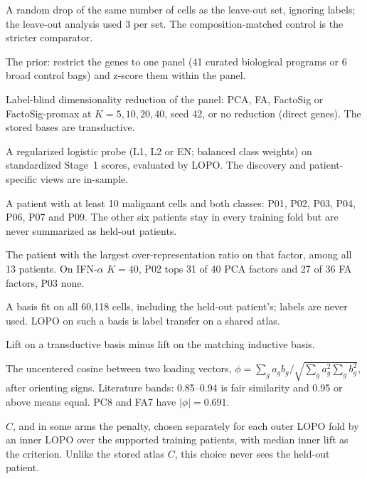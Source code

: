 \begin{description}[leftmargin=0pt,itemsep=3pt,font=\normalfont\bfseries]
\item[Size-matched control.] A random drop of the same number of cells as the leave-out set, ignoring labels; the leave-out analysis used 3 per set. The composition-matched control is the stricter comparator.

\item[Stage~0.] The prior: restrict the genes to one panel (41 curated biological programs or 6 broad control bags) and z-score them within the panel.

\item[Stage~1.] Label-blind dimensionality reduction of the panel: PCA, FA, FactoSig or FactoSig-promax at $K=5,10,20,40$, seed 42, or no reduction (direct genes). The stored bases are transductive.

\item[Stage~2.] A regularized logistic probe (L1, L2 or EN; balanced class weights) on standardized Stage~1 scores, evaluated by LOPO. The discovery and patient-specific views are in-sample.

\item[Supported patient.] A patient with at least 10 malignant cells and both classes: P01, P02, P03, P04, P06, P07 and P09. The other six patients stay in every training fold but are never summarized as held-out patients.

\item[Top patient (a patient ``tops'' a factor).] The patient with the largest over-representation ratio on that factor, among all 13 patients. On IFN-$\alpha$ $K = 40$, P02 tops 31 of 40 PCA factors and 27 of 36 FA factors, P03 none.

\item[Transductive (Stage~1).] A basis fit on all 60,118 cells, including the held-out patient's; labels are never used. LOPO on such a basis is label transfer on a shared atlas.

\item[Transductive optimism.] Lift on a transductive basis minus lift on the matching inductive basis.

\item[Tucker $\phi$ (congruence coefficient).] The uncentered cosine between two loading vectors, $\phi=\sum_g a_g b_g/\sqrt{\sum_g a_g^2\sum_g b_g^2}$, after orienting signs. Literature bands: 0.85--0.94 is fair similarity and 0.95 or above means equal. PC8 and FA7 have $|\phi|=0.691$.

\item[Tuned $C$ (per-fold tuned).] $C$, and in some arms the penalty, chosen separately for each outer LOPO fold by an inner LOPO over the supported training patients, with median inner lift as the criterion. Unlike the stored atlas $C$, this choice never sees the held-out patient.


\end{description}
